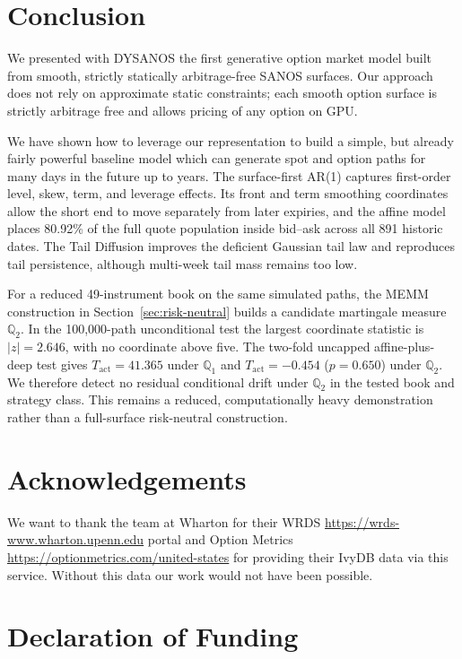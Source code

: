 \documentclass[11pt,a4paper]{article}
\newcommand{\Q}{\mathbb{Q}}
\renewcommand{\Q}{\mathbb{Q}}
\begin{document}
\section{Conclusion}

We presented with DYSANOS the first generative option market model built from
smooth, strictly statically arbitrage-free SANOS surfaces. Our approach does not rely on
approximate static constraints; each smooth option surface is strictly arbitrage free and allows
pricing of any option on GPU.

We have shown how
to leverage our representation to build a simple, but already fairly powerful baseline
model which can generate spot and option paths for many days in the future up to years.
The surface-first AR(1) captures first-order level, skew, term, and leverage
effects.  Its front and term smoothing coordinates allow the short end to move
separately from later expiries, and the affine model places
80.92\% of the full quote population inside bid--ask across all 891 historic dates. The Tail Diffusion
improves the deficient Gaussian
tail law and reproduces tail persistence, although multi-week tail mass
remains too low.  

For a reduced 49-instrument book on the same simulated paths, the MEMM
construction in Section~\ref{sec:risk-neutral} builds a candidate
martingale measure~$\Q_2$.  In the 100,000-path unconditional test the
largest coordinate statistic is $|z|=2.646$, with no coordinate above five.
The two-fold uncapped affine-plus-deep test gives $T_{\mathrm{act}}=41.365$
under $\Q_1$ and $T_{\mathrm{act}}=-0.454$ ($p=0.650$) under $\Q_2$.  We
therefore detect no residual conditional drift under $\Q_2$ in the tested book
and strategy class.  This remains a reduced, computationally heavy
demonstration rather than a full-surface risk-neutral construction.

\section*{Acknowledgements}

We want to thank the team at Wharton for their WRDS \url{https://wrds-www.wharton.upenn.edu} portal and Option Metrics \url{https://optionmetrics.com/united-states} 
for providing their IvyDB data via this service. Without this data our work would not have been possible.

\section*{Declaration of Funding}
\end{document}
